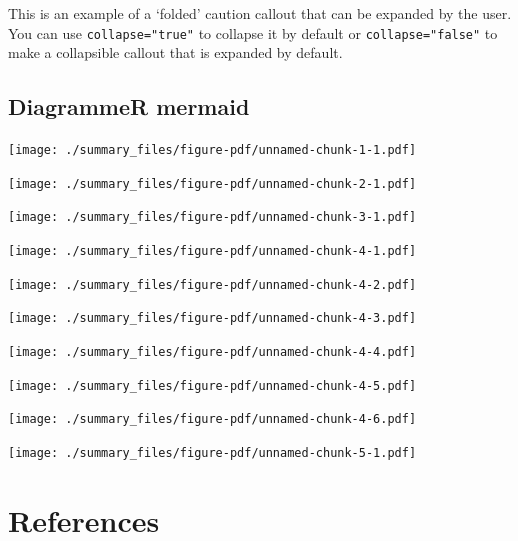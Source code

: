 \documentclass[
  letterpaper,
]{scrbook}
\newlength{\cslhangindent}
\newlength{\cslentryspacingunit} %
\newenvironment{CSLReferences}[2] %
 {%
  \setlength{\parindent}{0pt}
  \ifodd #1
  \let\oldpar\par
  \def\par{\hangindent=\cslhangindent\oldpar}
  \fi
  \setlength{\parskip}{#2\cslentryspacingunit}
 }%
 {}
\begin{document}
\begin{tcolorbox}[enhanced jigsaw, coltitle=black, colback=white, breakable, toprule=.15mm, bottomrule=.15mm, title=\textcolor{quarto-callout-caution-color}{\faFire}\hspace{0.5em}{Expand To Learn About Collapse}, rightrule=.15mm, opacitybacktitle=0.6, toptitle=1mm, titlerule=0mm, left=2mm, colbacktitle=quarto-callout-caution-color!10!white, bottomtitle=1mm, colframe=quarto-callout-caution-color-frame, arc=.35mm, leftrule=.75mm, opacityback=0]

This is an example of a `folded' caution callout that can be expanded by
the user. You can use \texttt{collapse="true"} to collapse it by default
or \texttt{collapse="false"} to make a collapsible callout that is
expanded by default.

\end{tcolorbox}

\hypertarget{diagrammer-mermaid}{%
\section{DiagrammeR mermaid}\label{diagrammer-mermaid}}

\texttt{[image: ./summary\_files/figure-pdf/unnamed-chunk-1-1.pdf]}

\texttt{[image: ./summary\_files/figure-pdf/unnamed-chunk-2-1.pdf]}

\texttt{[image: ./summary\_files/figure-pdf/unnamed-chunk-3-1.pdf]}

\texttt{[image: ./summary\_files/figure-pdf/unnamed-chunk-4-1.pdf]}

\texttt{[image: ./summary\_files/figure-pdf/unnamed-chunk-4-2.pdf]}

\texttt{[image: ./summary\_files/figure-pdf/unnamed-chunk-4-3.pdf]}

\texttt{[image: ./summary\_files/figure-pdf/unnamed-chunk-4-4.pdf]}

\texttt{[image: ./summary\_files/figure-pdf/unnamed-chunk-4-5.pdf]}

\texttt{[image: ./summary\_files/figure-pdf/unnamed-chunk-4-6.pdf]}

\texttt{[image: ./summary\_files/figure-pdf/unnamed-chunk-5-1.pdf]}


\hypertarget{references}{%
\chapter*{References}\label{references}}


\hypertarget{refs}{}
\begin{CSLReferences}{0}{0}
\end{CSLReferences}


\backmatter

\printindex
\end{document}
